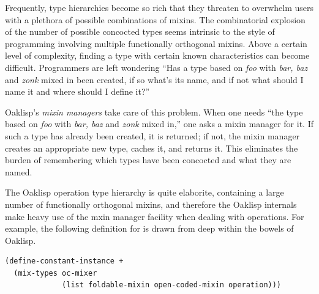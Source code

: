Frequently, type hierarchies become so rich that they threaten to
overwhelm users with a plethora of possible combinations of mixins.
The combinatorial explosion of the number of possible concocted types
seems intrinsic to the style of programming involving multiple
functionally orthogonal mixins.  Above a certain level of complexity,
finding a type with certain known characteristics can become
difficult.  Programmers are left wondering ``Has a type based on
\emph{foo} with \emph{bar, baz} and \emph{zonk} mixed in been created, if so
what's its name, and if not what should I name it and where should I
define it?''

Oaklisp's \emph{mixin managers} take care of this problem.  When one
needs ``the type based on \emph{foo} with \emph{bar, baz} and \emph{zonk}
mixed in,'' one asks a mixin manager for it.  If such a type has
already been created, it is returned; if not, the mixin manager
creates an appropriate new type, caches it, and returns it.  This
eliminates the burden of remembering which types have been concocted
and what they are named.



The Oaklisp operation type hierarchy is quite elaborite, containing a
large number of functionally orthogonal mixins, and therefore the
Oaklisp internals make heavy use of the mxin manager facility when
dealing with operations.  For example, the following definition for
\df{+} is drawn from deep within the bowels of Oaklisp.
\begin{verbatim}
(define-constant-instance +
  (mix-types oc-mixer
             (list foldable-mixin open-coded-mixin operation)))
\end{verbatim}
